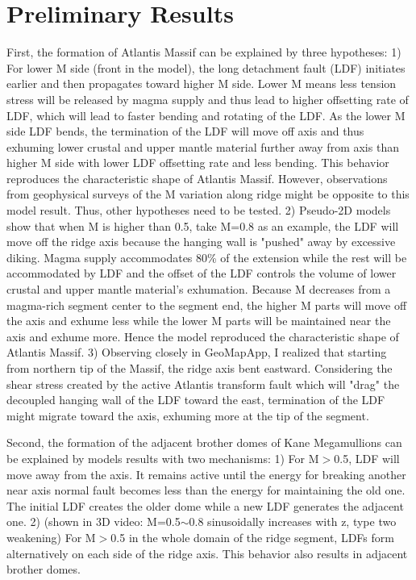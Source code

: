 \documentclass[12pt]{article}
\begin{document}
\section{Preliminary Results}
First, the formation of Atlantis Massif can be explained by three hypotheses: 
1) For lower M side (front in the model), the long detachment fault (LDF) initiates earlier and then propagates toward higher M side. Lower M means less tension stress will be released by magma supply and thus lead to higher offsetting rate of LDF, which will lead to faster bending and rotating of the LDF. As the lower M side LDF bends, the termination of the LDF will move off axis and thus exhuming lower crustal and upper mantle material further away from axis than higher M side with lower LDF offsetting rate and less bending. This behavior reproduces the characteristic shape of Atlantis Massif. However, observations from geophysical surveys of the M variation along ridge might be opposite to this model result. Thus, other hypotheses need to be tested.
2) Pseudo-2D models show that when M is higher than 0.5, take M=0.8 as an example, the LDF will move off the ridge axis because the hanging wall is "pushed" away by excessive diking. Magma supply accommodates 80\% of the extension while the rest will be accommodated by LDF and the offset of the LDF controls the volume of lower crustal and upper mantle material’s exhumation. Because M decreases from a magma-rich segment center to the segment end, the higher M parts will move off the axis and exhume less while the lower M parts will be maintained near the axis and exhume more. Hence the model reproduced the characteristic shape of Atlantis Massif. 
3) Observing closely in GeoMapApp, I realized that starting from northern tip of the Massif, the ridge axis bent eastward. Considering the shear stress created by the active Atlantis transform fault which will "drag" the decoupled hanging wall of the LDF toward the east, termination of the LDF might migrate toward the axis, exhuming more at the tip of the segment. 

Second, the formation of the adjacent brother domes of Kane Megamullions can be explained by models results with two mechanisms: 1) For M$>$0.5, LDF will move away from the axis. It remains active until the energy for breaking another near axis normal fault becomes less than the energy for maintaining the old one. The initial LDF creates the older dome while a new LDF generates the adjacent one. 2) (shown in 3D video:
M=0.5$\sim$0.8 sinusoidally increases with z, type two weakening) For M$>$0.5 in the whole domain of the ridge segment, LDFs form alternatively on each side of the ridge axis. This behavior also results in adjacent brother domes. 
\end{document}
